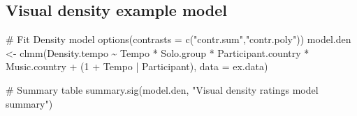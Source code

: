 \documentclass[
  bookmarksnumbered]{article}
\newenvironment{Shaded}{\begin{snugshade}}{\end{snugshade}}
\newcommand{\AttributeTok}[1]{\textcolor[rgb]{0.80,0.80,0.80}{#1}}
\newcommand{\CommentTok}[1]{\textcolor[rgb]{0.50,0.62,0.50}{#1}}
\newcommand{\DecValTok}[1]{\textcolor[rgb]{0.86,0.86,0.80}{#1}}
\newcommand{\FunctionTok}[1]{\textcolor[rgb]{0.94,0.94,0.56}{#1}}
\newcommand{\NormalTok}[1]{\textcolor[rgb]{0.80,0.80,0.80}{#1}}
\newcommand{\OtherTok}[1]{\textcolor[rgb]{0.94,0.94,0.56}{#1}}
\newcommand{\SpecialCharTok}[1]{\textcolor[rgb]{0.86,0.64,0.64}{#1}}
\newcommand{\StringTok}[1]{\textcolor[rgb]{0.80,0.58,0.58}{#1}}
\begin{document}
\hypertarget{visual-density-example-model}{%
\subsection{Visual density example model}\label{visual-density-example-model}}

\begin{Shaded}
\begin{Highlighting}[]
\CommentTok{\# Fit Density model}
\FunctionTok{options}\NormalTok{(}\AttributeTok{contrasts =} \FunctionTok{c}\NormalTok{(}\StringTok{"contr.sum"}\NormalTok{,}\StringTok{"contr.poly"}\NormalTok{))}
\NormalTok{model.den }\OtherTok{\textless{}{-}} \FunctionTok{clmm}\NormalTok{(Density.tempo }\SpecialCharTok{\textasciitilde{}}\NormalTok{ Tempo }\SpecialCharTok{*}\NormalTok{ Solo.group }\SpecialCharTok{*}\NormalTok{ Participant.country }\SpecialCharTok{*}\NormalTok{ Music.country }\SpecialCharTok{+} 
\NormalTok{                    (}\DecValTok{1} \SpecialCharTok{+}\NormalTok{ Tempo }\SpecialCharTok{|}\NormalTok{ Participant),}
                  \AttributeTok{data =}\NormalTok{ ex.data)}

\CommentTok{\# Summary table}
\FunctionTok{summary.sig}\NormalTok{(model.den, }\StringTok{"Visual density ratings model summary"}\NormalTok{)}
\end{Highlighting}
\end{Shaded}
\end{document}
